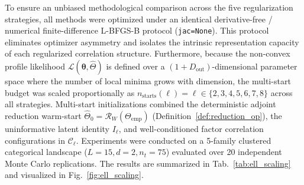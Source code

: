 \documentclass[default,sn-mathphys,Numbered]{sn-jnl}
\theoremstyle{thmstyleone}
\theoremstyle{thmstylethree}
\theoremstyle{thmstyletwo}
\newcommand{\outp}{\text{out}}
\begin{document}
To ensure an unbiased methodological comparison across the five regularization strategies, all methods were optimized under an identical derivative-free / numerical finite-difference L-BFGS-B protocol (\texttt{jac=None}). This protocol eliminates optimizer asymmetry and isolates the intrinsic representation capacity of each regularized correlation structure. Furthermore, because the non-convex profile likelihood $\mathcal{L}(\bm{\theta}, \hat{\Theta})$ is defined over a $(1 + D_{\outp})$-dimensional parameter space where the number of local minima grows with dimension, the multi-start budget was scaled proportionally as $n_{\mathrm{starts}}(\ell) = \ell \in \{2, 3, 4, 5, 6, 7, 8\}$ across all strategies. Multi-start initializations combined the deterministic adjoint reduction warm-start $\hat{\Theta}_0 = \mathcal{R}_W(\Theta_{\mathrm{emp}})$ (Definition~\ref{def:reduction_op}), the uninformative latent identity $I_\ell$, and well-conditioned factor correlation configurations in $\mathcal{C}_\ell$. Experiments were conducted on a 5-family clustered categorical landscape ($L = 15, d = 2, n_t = 75$) evaluated over 20 independent Monte Carlo replications. The results are summarized in Tab.~\ref{tab:ell_scaling} and visualized in Fig.~\ref{fig:ell_scaling}.
\end{document}
